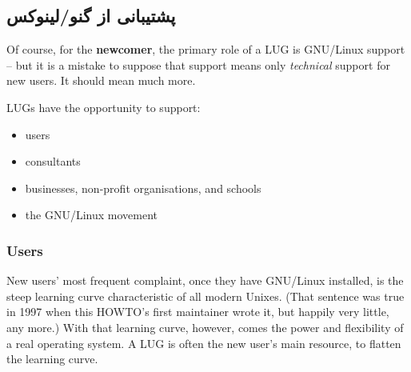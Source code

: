 
\subsection{پشتیبانی از گنو/لینوکس }

Of course, for the {\bfseries newcomer}, the primary role of a
LUG is GNU/Linux support -- but it is a mistake to suppose that 
support means only {\itshape technical\/} support for new users. It
should mean much more.

LUGs have the opportunity to support:

\begin{itemize}
\item users
\item consultants
\item businesses, non-profit organisations, and schools
\item the GNU/Linux movement
\end{itemize}

\subsubsection{Users}

New users' most frequent complaint, once they have GNU/Linux
installed, is the steep learning curve characteristic of all modern 
Unixes. (That sentence was true in 1997 when this HOWTO's first
maintainer wrote it, but happily very little, any more.)  With that learning
curve, however, comes the power and flexibility of a real operating
system. A LUG is often the new user's main resource, to flatten the
learning curve.

